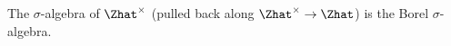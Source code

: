 The $\sigma$-algebra of $\Zhat^\times$ (pulled back along $\Zhat^\times\to\Zhat$) is the Borel $\sigma$-algebra.
